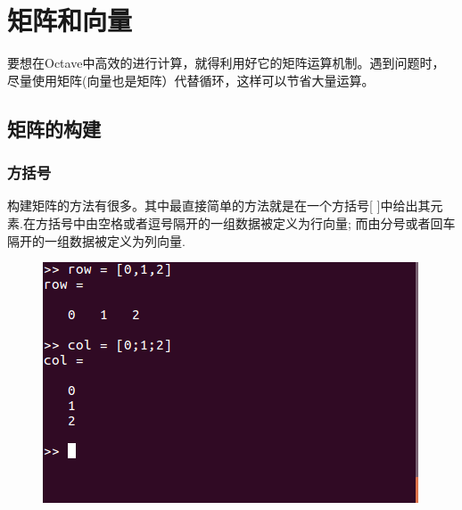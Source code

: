 \documentclass[a4paper,11pt]{ctexart}
\begin{document}
\section{矩阵和向量}
要想在Octave中高效的进行计算，就得利用好它的矩阵运算机制。遇到问题时，尽量使用矩阵(向量也是矩阵）代替循环，这样可以节省大量运算。\par
\subsection{矩阵的构建}
\subsubsection{方括号}
构建矩阵的方法有很多。其中最直接简单的方法就是在一个方括号[ ]中给出其元素.在方括号中由空格或者逗号隔开的一组数据被定义为行向量; 而由分号或者回车隔开的一组数据被定义为列向量.
\begin{figure}[H]
	\begin{center}
		\includegraphics[width=.6\textwidth]{vector.png}
	\end{center}
\end{figure}
\end{document}
